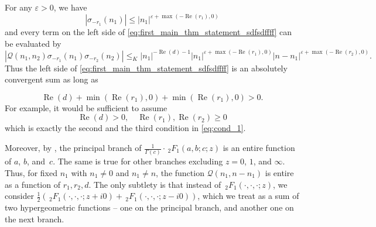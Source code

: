 \documentclass[]{article}
\renewcommand{\Re}{\operatorname{Re}}
\begin{document}
For any $\varepsilon>0$, we have 
\begin{equation}
|    \sigma_{-r_1}(n_1) | \le |n_1|^{\varepsilon + \max ( - \Re(r_1), 0 )}
\end{equation}
and every term on the left side of \eqref{eq:first_main_thm_statement_sdfsdffff}  can be evaluated by 
\begin{equation}\label{eq:est_on_Q}
    |\mathcal{Q}(n_1,n_2)  \sigma_{-r_1}(n_1) \sigma_{-r_2}(n_2)| \le_K |n_1|^{-\Re(d)-1} |n_1|^{ \varepsilon + \max (- \Re (r_1), 0) } |n-n_1|^{ \varepsilon + \max (- \Re (r_2), 0) } .
\end{equation}
Thus the left side of \eqref{eq:first_main_thm_statement_sdfsdffff} is an absolutely convergent sum as long as 

\begin{equation}
    \Re (d)  + \min ( \Re (r_1), 0) + \min ( \Re (r_1), 0) > 0.
\end{equation}
For example, it would be sufficient to assume 
\begin{equation}\label{eq:domain_of_interesedfsdffff}
    \Re (d) > 0, \quad  \Re (r_1),  \Re (r_2) \ge 0
\end{equation}
which is exactly the second and the third condition in \eqref{eq:cond_1}.

Moreover, by \cite[15.2(ii)]{NIST}, the principal branch of $\frac{1}{\Gamma(c)} \cdot \, _2 F_1(a, b; c; z)$ is an entire function of $a$, $b$, and~$c$. The same is true for other branches excluding $z = 0$, $1$, and $\infty$. Thus, for fixed $n_1$ with $n_1 \neq 0$ and  $n_1 \neq n$, the function $\mathcal{Q}(n_1, n-n_1)$ is entire as a function of $r_1, r_2, d$. The only subtlety is that instead of $\, _2 F_1 (\cdot, \cdot , \cdot ; z)$, we consider $ \tfrac{1}{2} (\, _2 F_1 (\cdot, \cdot , \cdot ; z+i 0)+\, _2 F_1 (\cdot, \cdot , \cdot ; z-i0))$, which we treat as a sum of two hypergeometric functions -- one on the principal branch, and another one on the next branch.
\end{document}

